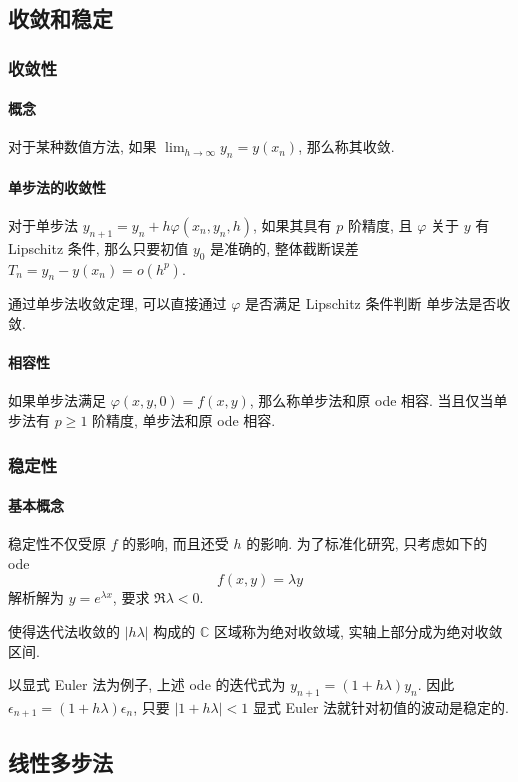 \documentclass{ctexart}
\newcommand{\Cset}{\mathbb{C}}
\begin{document}
\subsection{收敛和稳定}
\subsubsection{收敛性}
\paragraph{概念}
    对于某种数值方法, 如果 $\lim_{h \to \infty} y_n = y(x_n)$, 那么称其收敛.
\paragraph{单步法的收敛性}
    对于单步法 $y_{n+1} = y_n + h \varphi(x_n, y_n, h)$, 如果其具有 $p$ 阶精度,
    且 $\varphi$ 关于 $y$ 有 Lipschitz 条件, 那么只要初值 $y_0$ 是准确的,
    整体截断误差 $T_{n} = y_n - y(x_n) = o(h^p)$.\par
    通过单步法收敛定理, 可以直接通过 $\varphi$ 是否满足 Lipschitz 条件判断
    单步法是否收敛.
\paragraph{相容性}
    如果单步法满足 $\varphi(x, y, 0) = f(x, y)$, 那么称单步法和原 ode 相容.
    当且仅当单步法有 $p \ge 1$ 阶精度, 单步法和原 ode 相容.
\subsubsection{稳定性}
\paragraph{基本概念}
    稳定性不仅受原 $f$ 的影响, 而且还受 $h$ 的影响. 为了标准化研究, 只考虑如下的 ode \[
        f(x, y) = \lambda y\]
    解析解为 $y = e^{\lambda x}$, 要求 $\Re \lambda < 0$.\par
    使得迭代法收敛的 $|h\lambda|$ 构成的 $\Cset$ 区域称为绝对收敛域, 实轴上部分成为绝对收敛区间.\par
    以显式 Euler 法为例子, 上述 ode 的迭代式为 $y_{n+1} = (1+h\lambda) y_n$.
    因此 $\epsilon_{n+1} = (1 + h\lambda) \epsilon_{n}$, 只要 $|1 + h\lambda| < 1$
    显式 Euler 法就针对初值的波动是稳定的.\par

\subsection{线性多步法}
\end{document}
